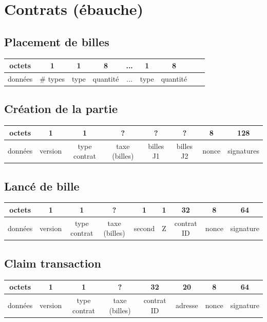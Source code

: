 \documentclass{article}
\begin{document}
\newpage
\section{Contrats (ébauche)}
\subsection*{Placement de billes}
\hspace*{-1cm}%
\begin{tabular}{ |c|c|c|c|c|c|c|c|c| } 
 \hline
octets & 1 & 1 & 8 & ... & 1 & 8\\ 
 \hline
    données & \# types & type & quantité & ... & type & quantité \\ 
 \hline
\end{tabular}
\subsection{Création de la partie}
\hspace*{-1cm}%
\begin{tabular}{ |c|c|c|c|c|c|c|c|} 
 \hline
 octets & 1 & 1 & ? & ? & ? & 8 & 128\\ 
 \hline
    données & version & type contrat & taxe (billes) & billes J1 & billes J2 & nonce & signatures\\ 
 \hline
\end{tabular}

\subsection{Lancé de bille}
\hspace*{-1cm}%
\begin{tabular}{ |c|c|c|c|c|c|c|c|c|} 
 \hline
 octets & 1 & 1 & ? & 1 & 1 & 32 & 8 & 64 \\ 
 \hline
    données & version & type contrat & taxe (billes) & second & Z & contrat ID & nonce & signature\\ 
 \hline
\end{tabular}

\subsection{Claim transaction}
\hspace*{-1cm}%
\begin{tabular}{ |c|c|c|c|c|c|c|c|} 
 \hline
 octets & 1 & 1 & ? & 32 & 20 & 8 & 64 \\ 
 \hline
    données & version & type contrat & taxe (billes) & contrat ID & adresse & nonce & signature\\ 
 \hline
\end{tabular}
\end{document}
